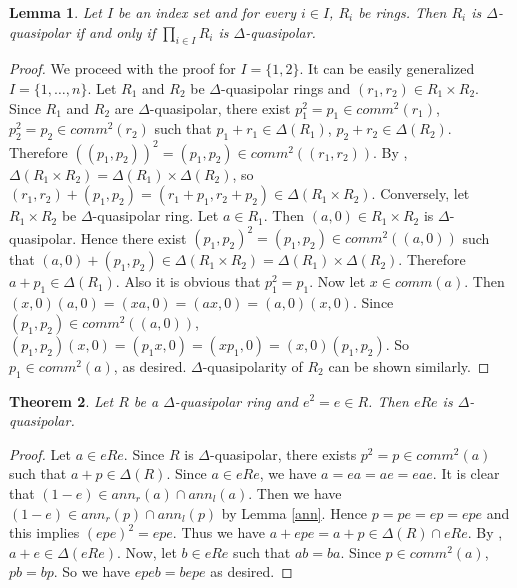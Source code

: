 \documentclass[12pt, reqno]{amsart}
\newtheorem{thm}{Theorem}[section]
\newtheorem{cor}[thm]{Corollary}
\newtheorem{lem}[thm]{Lemma}
\numberwithin{equation}{section}
\begin{document}
\begin{lem}
    Let $I$ be an index set and for every $i\in I$, $R_i$ be rings. Then $R_i$ is $\Delta$-quasipolar if and only if $\prod_{i\in I}R_i$ is $\Delta$-quasipolar.
\end{lem}

\begin{proof}
    We proceed with the proof for $I=\{1,2\}$. It can be easily generalized $I=\{1,\dots, n\}$. Let $R_1$ and $R_2$ be $\Delta$-quasipolar rings and $(r_1,r_2) \in R_1\times R_2$. Since $R_1$ and $R_2$ are $\Delta$-quasipolar, there exist $p_1^2=p_1\in comm^2(r_1)$, $p_2^2=p_2\in comm^2(r_2)$ such that $p_1+r_1\in \Delta(R_1)$, $p_2+r_2\in \Delta(R_2)$. Therefore $((p_1,p_2))^2=(p_1,p_2)\in comm^2((r_1,r_2))$. By \cite[Lemma 1]{Leroy}, $\Delta(R_1\times R_2)=\Delta(R_1)\times \Delta(R_2)$, so $(r_1,r_2)+(p_1,p_2)=(r_1+p_1,r_2+p_2)\in \Delta(R_1\times R_2)$. Conversely, let $R_1\times R_2$ be $\Delta$-quasipolar ring. Let $a\in R_1$. Then $(a,0)\in R_1\times R_2$ is $\Delta$-quasipolar. Hence there exist $(p_1,p_2)^2=(p_1,p_2)\in comm^2((a,0))$ such that $(a,0)+(p_1,p_2) \in \Delta(R_1\times R_2)= \Delta(R_1)\times \Delta(R_2)$. Therefore $a+p_1\in \Delta(R_1)$. Also it is obvious that $p_1^2=p_1$. Now let $x\in comm(a)$. Then $(x,0)(a,0)=(xa,0)=(ax,0)=(a,0)(x,0)$. Since $(p_1,p_2)\in comm^2((a,0))$, $(p_1,p_2)(x,0)=(p_1x,0)=(xp_1,0)=(x,0)(p_1,p_2)$. So $p_1\in comm^2(a)$,  as desired. $\Delta$-quasipolarity of $R_2$ can be shown similarly.
\end{proof}





\begin{thm}\label{eRe}
    Let $R$ be a $\Delta$-quasipolar ring and $e^2=e\in R$. Then $eRe$ is $\Delta$-quasipolar.
\end{thm}

\begin{proof}
    Let $a\in eRe$. Since $R$ is $\Delta$-quasipolar, there exists $p^2=p\in comm^2(a)$ such that $a+p\in \Delta(R)$. Since $a\in eRe$, we have $a=ea=ae=eae$. It is clear that $(1-e)\in ann_r(a)\cap ann_l(a)$. Then we have $(1-e)\in ann_r(p)\cap ann_l(p)$ by Lemma \ref{ann}. Hence $p=pe=ep=epe$ and this implies $(epe)^2=epe$. Thus  we have $a+epe=a+p \in \Delta(R)\cap eRe$. By \cite[Lemma 2.19]{Danchev}, $a+e\in \Delta(eRe)$. Now, let $b\in eRe$ such that $ab=ba$. Since $p\in comm^2(a)$, $pb=bp$. So we have $epeb=bepe$ as desired.
\end{proof}
\end{document}
